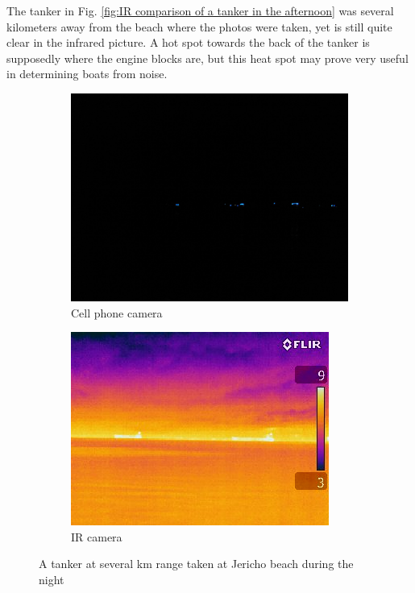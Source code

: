 The tanker in Fig. \ref{fig:IR comparison of a tanker in the afternoon} was several kilometers away from the beach where the photos were taken, yet is still quite clear in the infrared picture. A hot spot towards the back of the tanker is supposedly where the engine blocks are, but this heat spot may prove very useful in determining boats from noise.

\begin{figure}[H]
\centering
\begin{subfigure}{.5\textwidth}
  \centering
  \includegraphics[width=.8\linewidth]{"./image/jericho-night-tankers-visible"}
  \caption{Cell phone camera}
  \label{fig:sub1}
\end{subfigure}%
\begin{subfigure}{.5\textwidth}
  \centering
  \includegraphics[width=.8\linewidth]{"./image/jericho-night-tankers-ir"}
  \caption{IR camera}
  \label{fig:sub2}
\end{subfigure}
\caption{A tanker at several km range taken at Jericho beach during the night}
\label{fig:IR comparison of a tanker at night}
\end{figure}

